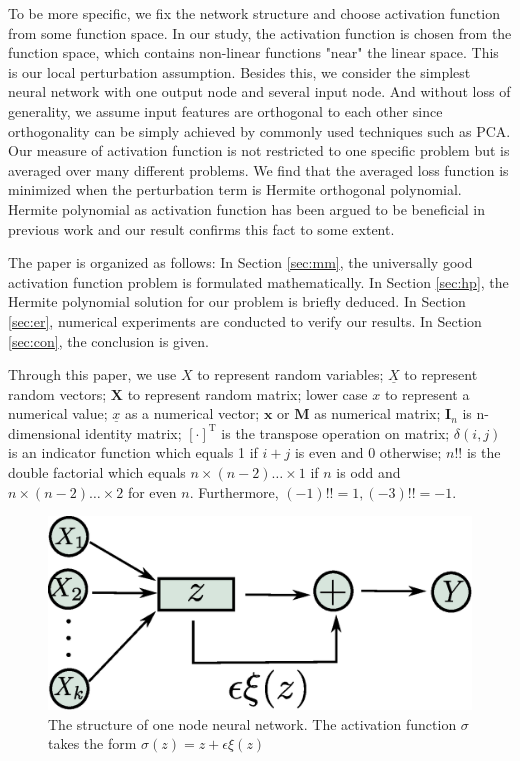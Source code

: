 \documentclass[conference]{IEEEtran}
\def\T{\mathrm{T}}
\begin{document}
To be more specific, we fix the network structure and choose activation function from some function space.
In our study, the activation function is chosen from the function space, which contains non-linear functions "near" the linear space.
This is our local perturbation assumption. Besides this, we consider the simplest neural network with one output node and several input node.
And without loss of generality, we assume input features are orthogonal to each other since orthogonality can be simply achieved by commonly used techniques such as PCA.
Our measure of activation function is not restricted to one specific problem but is averaged over many different problems.
We find that the averaged loss function is minimized when the perturbation term is Hermite orthogonal polynomial.
Hermite polynomial as activation function has been argued to be beneficial in previous work \cite{ma2005constructive} and our result confirms this fact to some extent.

The paper is organized as follows: In Section \ref{sec:mm}, the universally good activation function problem
is formulated mathematically.
In Section \ref{sec:hp}, the Hermite polynomial solution for our problem is briefly deduced.
In Section \ref{sec:er}, numerical experiments are conducted to verify our results.
In Section \ref{sec:con}, the conclusion is given.

Through this paper, we use $X$ to represent random variables;
$\underline{X}$ to represent random vectors;
$\bm{X}$ to represent random matrix;
lower case $x$ to represent a numerical value;
$\underline{x}$ as a numerical vector;
$\bm{x}$  or $\mathbf{M}$ as numerical matrix; $\mathbf{I}_n$ is n-dimensional identity matrix; 
$[\cdot]^\T$ is the transpose operation on matrix; $\delta(i, j)$ is an indicator function
which equals 1 if $ i + j$ is even and 0 otherwise; 
$n!!$ is the double factorial which equals $n \times (n-2) \dots \times1$ if $n$ is odd and $n \times (n-2)\dots \times 2$ for even $n$. Furthermore, $(-1)!!=1,(-3)!!=-1$.

\begin{figure}\label{fig:ns}
\includegraphics[width=\linewidth]{network_structure.eps}
\caption{The structure of one node neural network. The activation function $\sigma$ takes the form $\sigma(z)=z + \epsilon \xi(z)$}
\end{figure}
\end{document}
